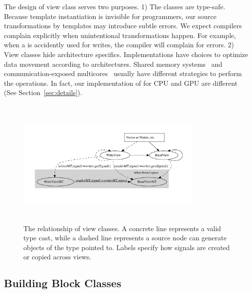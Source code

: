 
The design of view class serves two purposes. 1) The classes are type-safe.
Because template instantiation is invisible for programmers, our
source transformations by templates may introduce subtle errors. We
expect compilers complain explicitly when unintentional
transformations happen. For example, when a  is accidently used
for writes, the compiler will complain for errors. 2) View classes hide architecture specifics. %
Implementations have choices to optimize data movement according to
architectures. Shared memory systems~\cite{larrabee} and communication-exposed
multicores~\cite{cellbe, imagine} usually have different strategies to perform
the operations. In fact, our implementation of for CPU and GPU are different (See
Section~\ref{sec:details}).

\begin{figure}
\includegraphics[width=3.6in, height=2.5in]{../relationship_views}
\caption{The relationship of view classes. A concrete line represents a valid
   type cast, while a dashed line represents a source node can generate objects
of the type pointed to. Labels specify how signals are created or copied
across views.}
\label{fig:view}
\end{figure}


\subsection{Building Block Classes}
\label{sect:bb}

